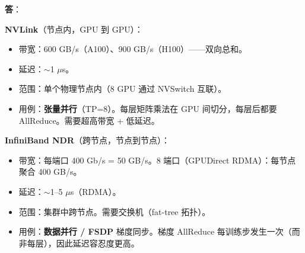 \begin{questionbox}
\textbf{答}：

\textbf{NVLink}（节点内，GPU 到 GPU）：

\begin{itemize}
  \item 带宽：600 GB/s（A100）、900 GB/s（H100）——双向总和。
  \item 延迟：$\sim$1 $\mu$s。
  \item 范围：单个物理节点内（8 GPU 通过 NVSwitch 互联）。
  \item 用例：\textbf{张量并行}（TP=8）。每层矩阵乘法在 GPU 间切分，每层后都要 AllReduce。需要超高带宽 + 低延迟。
\end{itemize}

\textbf{InfiniBand NDR}（跨节点，节点到节点）：

\begin{itemize}
  \item 带宽：每端口 400 Gb/s = 50 GB/s。8 端口（GPUDirect RDMA）：每节点聚合 400 GB/s。
  \item 延迟：$\sim$1--5 $\mu$s（RDMA）。
  \item 范围：集群中跨节点。需要交换机（fat-tree 拓扑）。
  \item 用例：\textbf{数据并行 / FSDP} 梯度同步。梯度 AllReduce 每训练步发生一次（而非每层），因此延迟容忍度更高。
\end{itemize}


\end{questionbox}
